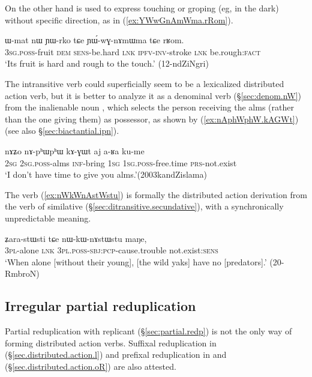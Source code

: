 On the other hand  is used to express touching or groping (eg, in the dark) without specific direction, as in (\ref{ex:YWwGnAmWma.rRom}).

\begin{exe}
\ex \label{ex:YWwGnAmWma.rRom}
\gll ɯ-mat nɯ ɲɯ-rko tɕe ɲɯ́-wɣ-nɤmɯma tɕe rʁom.\\
\textsc{3sg}.\textsc{poss}-fruit \textsc{dem} \textsc{sens}-be.hard \textsc{lnk} \textsc{ipfv}-\textsc{inv}-stroke \textsc{lnk} be.rough:\textsc{fact}\\
\glt `Its fruit is hard and rough to the touch.' (12-ndZiNgri)
\end{exe}

The intransitive verb  could superficially seem to be a lexicalized distributed action verb, but it is better to analyze it as a denominal verb (§\ref{sec:denom.nW}) from the inalienable noun , which selects the person receiving the alms (rather than the one giving them) as possessor, as shown by (\ref{ex:nAphWphW.kAGWt}) (see also §\ref{sec:biactantial.ipn}).

\begin{exe}
\ex \label{ex:nAphWphW.kAGWt}
\gll nɤʑo nɤ-pʰɯpʰɯ kɤ-ɣɯt aj a-ʁa ku-me \\
\textsc{2sg} \textsc{2sg}.\textsc{poss}-alms \textsc{inf}-bring \textsc{1sg} \textsc{1sg}.\textsc{poss}-free.time \textsc{prs}-not.exist \\
\glt `I don't have time to give you alms.'(2003kandZislama)
\end{exe}

The verb  (\ref{ex:nWkWnAstWstu}) is formally the distributed action derivation from the verb of similative  (§\ref{sec:ditransitive.secundative}), with a synchronically unpredictable meaning.

\begin{exe}
\ex \label{ex:nWkWnAstWstu}
\gll ʑara-stɯsti tɕe nɯ-kɯ-nɤstɯstu maŋe, \\
\textsc{3pl}-alone \textsc{lnk} \textsc{3pl}.\textsc{poss}-\textsc{sbj}:\textsc{pcp}-cause.trouble not.exist:\textsc{sens} \\
\glt `When alone [without their young], [the wild yaks] have no [predators].' (20-RmbroN) 
\end{exe}

 
\subsection{Irregular partial reduplication}   \label{sec:irregular.reduplication}
Partial reduplication with  replicant (§\ref{sec:partial.redp}) is not the only way of forming distributed action verbs. Suffixal reduplication in  (§\ref{sec.distributed.action.l}) and prefixal reduplication in  and  (§\ref{sec.distributed.action.oR}) are also attested.

